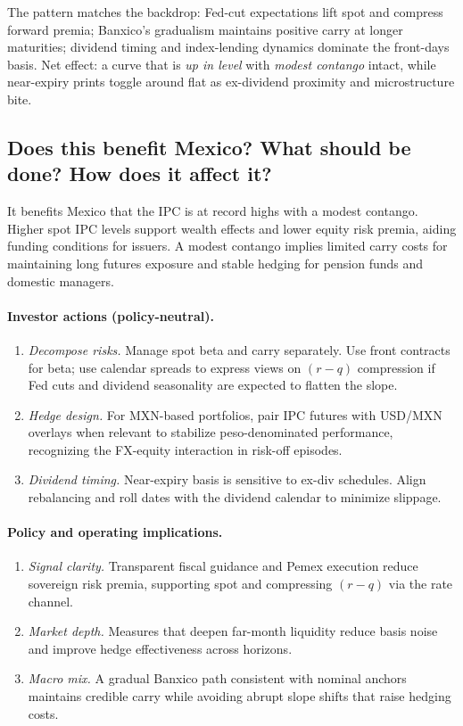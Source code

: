 \documentclass[11pt,a4paper]{article} %
\begin{document}
The pattern matches the backdrop: Fed-cut expectations lift spot and compress forward premia; Banxico's gradualism maintains positive carry at longer maturities; dividend timing and index-lending dynamics dominate the front-days basis. Net effect: a curve that is \emph{up in level} with \emph{modest contango} intact, while near-expiry prints toggle around flat as ex-dividend proximity and microstructure bite.

\subsection{Does this benefit Mexico? What should be done? How does it affect it?}
It benefits Mexico that the IPC is at record highs with a modest contango. Higher spot IPC levels support wealth effects and lower equity risk premia, aiding funding conditions for issuers. A modest contango implies limited carry costs for maintaining long futures exposure and stable hedging for pension funds and domestic managers.

\paragraph{Investor actions (policy-neutral).}
\begin{enumerate}
  \item \emph{Decompose risks.} Manage spot beta and carry separately. Use front contracts for beta; use calendar spreads to express views on \((r-q)\) compression if Fed cuts and dividend seasonality are expected to flatten the slope.
  \item \emph{Hedge design.} For MXN-based portfolios, pair IPC futures with USD/MXN overlays when relevant to stabilize peso-denominated performance, recognizing the FX-equity interaction in risk-off episodes.
  \item \emph{Dividend timing.} Near-expiry basis is sensitive to ex-div schedules. Align rebalancing and roll dates with the dividend calendar to minimize slippage.
\end{enumerate}

\paragraph{Policy and operating implications.}
\begin{enumerate}
  \item \emph{Signal clarity.} Transparent fiscal guidance and Pemex execution reduce sovereign risk premia, supporting spot and compressing \((r-q)\) via the rate channel.
  \item \emph{Market depth.} Measures that deepen far-month liquidity reduce basis noise and improve hedge effectiveness across horizons.
  \item \emph{Macro mix.} A gradual Banxico path consistent with nominal anchors maintains credible carry while avoiding abrupt slope shifts that raise hedging costs.
\end{enumerate}
\end{document}
